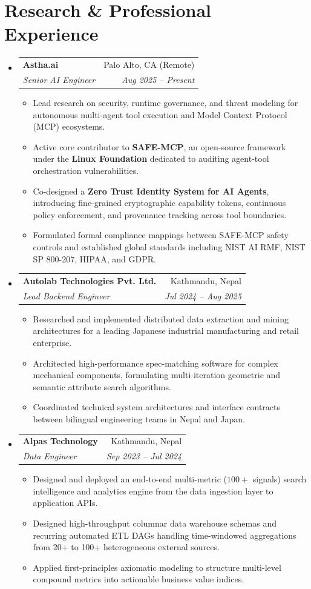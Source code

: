 \documentclass[10pt,letterpaper]{article}
\makeatletter
\newcommand{\resumeSubheading}[4]{
  \vspace{0.5pt}
  \item[]
    \begin{tabular*}{\linewidth}[t]{l@{\extracolsep{\fill}}r}
      \textbf{#1} & \small #2 \\
      \textit{\small#3} & \textit{\small #4} \\
    \end{tabular*}\vspace{-5pt}
}
\makeatother
\begin{document}
\section{Research \& Professional Experience}
\begin{itemize}[leftmargin=*,label={}]
  \resumeSubheading
    {Astha.ai}{Palo Alto, CA (Remote)}
    {Senior AI Engineer}{Aug 2025 -- Present}
    \begin{itemize}[leftmargin=*,itemsep=1pt,topsep=1pt]
      \item Lead research on security, runtime governance, and threat modeling for autonomous multi-agent tool execution and Model Context Protocol (MCP) ecosystems.
      \item Active core contributor to \textbf{SAFE-MCP}, an open-source framework under the \textbf{Linux Foundation} dedicated to auditing agent-tool orchestration vulnerabilities.
      \item Co-designed a \textbf{Zero Trust Identity System for AI Agents}, introducing fine-grained cryptographic capability tokens, continuous policy enforcement, and provenance tracking across tool boundaries.
      \item Formulated formal compliance mappings between SAFE-MCP safety controls and established global standards including NIST AI RMF, NIST SP 800-207, HIPAA, and GDPR.
    \end{itemize}

  \resumeSubheading
    {Autolab Technologies Pvt. Ltd.}{Kathmandu, Nepal}
    {Lead Backend Engineer}{Jul 2024 -- Aug 2025}
    \begin{itemize}[leftmargin=*,itemsep=1pt,topsep=1pt]
      \item Researched and implemented distributed data extraction and mining architectures for a leading Japanese industrial manufacturing and retail enterprise.
      \item Architected high-performance spec-matching software for complex mechanical components, formulating multi-iteration geometric and semantic attribute search algorithms.
      \item Coordinated technical system architectures and interface contracts between bilingual engineering teams in Nepal and Japan.
    \end{itemize}

  \resumeSubheading
    {Alpas Technology}{Kathmandu, Nepal}
    {Data Engineer}{Sep 2023 -- Jul 2024}
    \begin{itemize}[leftmargin=*,itemsep=1pt,topsep=1pt]
      \item Designed and deployed an end-to-end multi-metric ($100+$ signals) search intelligence and analytics engine from the data ingestion layer to application APIs.
      \item Designed high-throughput columnar data warehouse schemas and recurring automated ETL DAGs handling time-windowed aggregations from 20+ to 100+ heterogeneous external sources.
      \item Applied first-principles axiomatic modeling to structure multi-level compound metrics into actionable business value indices.
    \end{itemize}
\end{itemize}
\end{document}

